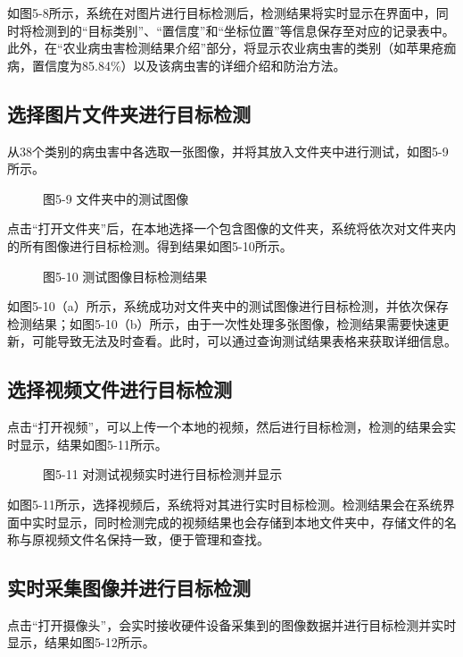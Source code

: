 \documentclass[12pt, a4paper, twoside]{ctexart}
\begin{document}
如图5-8所示，系统在对图片进行目标检测后，检测结果将实时显示在界面中，同时将检测到的“目标类别”、“置信度”和“坐标位置”等信息保存至对应的记录表中。此外，在“农业病虫害检测结果介绍”部分，将显示农业病虫害的类别（如苹果疮痂病，置信度为85.84\%）以及该病虫害的详细介绍和防治方法。


\subsection{选择图片文件夹进行目标检测}

从38个类别的病虫害中各选取一张图像，并将其放入文件夹中进行测试，如图5-9所示。


\begin{figure}[htbp]
\centering
\caption{图5-9 文件夹中的测试图像}
\end{figure}

点击“打开文件夹”后，在本地选择一个包含图像的文件夹，系统将依次对文件夹内的所有图像进行目标检测。得到结果如图5-10所示。


\begin{figure}[htbp]
\centering
\caption{图5-10 测试图像目标检测结果}
\end{figure}

如图5-10（a）所示，系统成功对文件夹中的测试图像进行目标检测，并依次保存检测结果；如图5-10（b）所示，由于一次性处理多张图像，检测结果需要快速更新，可能导致无法及时查看。此时，可以通过查询测试结果表格来获取详细信息。


\subsection{选择视频文件进行目标检测}

点击“打开视频”，可以上传一个本地的视频，然后进行目标检测，检测的结果会实时显示，结果如图5-11所示。


\begin{figure}[htbp]
\centering
\caption{图5-11 对测试视频实时进行目标检测并显示}
\end{figure}

如图5-11所示，选择视频后，系统将对其进行实时目标检测。检测结果会在系统界面中实时显示，同时检测完成的视频结果也会存储到本地文件夹中，存储文件的名称与原视频文件名保持一致，便于管理和查找。


\subsection{实时采集图像并进行目标检测}

点击“打开摄像头”，会实时接收硬件设备采集到的图像数据并进行目标检测并实时显示，结果如图5-12所示。
\end{document}
